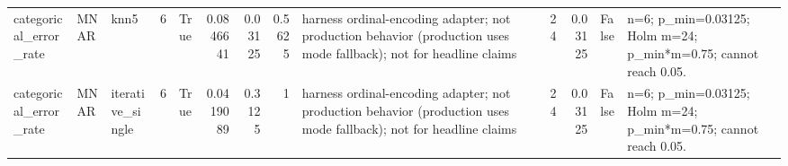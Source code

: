 \begin{table}[ht]
\begin{tabular}{lllrlrrrlrrll}
 categorical\_error\_rate & MNAR        & knn5             &            6 & True                &       0.0846641  & 0.03125    & 0.5625   & harness ordinal-encoding adapter; not production behavior (production uses mode fallback); not for headline claims &                             24 &                         0.03125    & False                       & n=6; p\_min=0.03125; Holm m=24; p\_min*m=0.75; cannot reach 0.05.  \\
 categorical\_error\_rate & MNAR        & iterative\_single &            6 & True                &       0.0419089  & 0.3125     & 1        & harness ordinal-encoding adapter; not production behavior (production uses mode fallback); not for headline claims &                             24 &                         0.03125    & False                       & n=6; p\_min=0.03125; Holm m=24; p\_min*m=0.75; cannot reach 0.05.  \\
\hline
\end{tabular}
\end{table}
